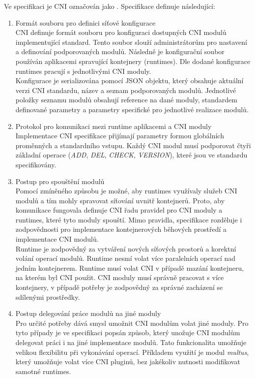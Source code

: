 Ve specifikaci je CNI označován jako \textit{}. \cite{containernetworking_2022_container} Specifikace definuje následující:
\begin{enumerate}
    \item Formát souboru pro definici síťové konfigurace\\
    CNI definuje formát souboru pro konfiguraci dostupných CNI modulů implementující standard. Tento soubor slouží administrátorům pro nastavení a definování podporovaných modulů. Následně je konfigurační soubor používán aplikacemi spravující kontejnery (runtimes). Dle dodané konfigurace runtimes pracují s jednotlivými CNI moduly.\\
    Konfigurace je serializována pomocí JSON objektu, který obsahuje aktuální verzi CNI standardu, název a seznam podporovaných modulů. Jednotlivé položky seznamu modulů obsahují reference na dané moduly, standardem definované parametry a parametry specifické pro jednotlivé realizace modulů.
    \item Protokol pro komunikaci mezi runtime aplikacemi a CNI moduly\\
    Implementace CNI specifikace přijímají parametry formou globálních proměnných a standardního vstupu. Každý CNI modul musí podporovat čtyři základní operace (\textit{ADD}, \textit{DEL}, \textit{CHECK}, \textit{VERSION}), které jsou ve standardu specifikovány.
    \item Postup pro spouštění modulů\\
    Pomocí zmíněného způsobu je možné, aby runtimes využívaly služeb CNI modulů a tím mohly spravovat síťování uvnitř kontejnerů. Proto, aby komunikace fungovala definuje CNI řadu pravidel pro CNI moduly a runtimes, které tyto moduly spouští. Mimo pravidla, specifikace rozděluje i zodpovědnosti pro implementace kontejnerových běhových prostředí a implementace CNI modulů.\\
    Runtime je zodpovědný za vytváření nových síťových prostorů a korektní volání operací modulů. Runtime nesmí volat více paralelních operací nad jedním kontejnerem. Runtime musí volat CNI v případě mazání kontejneru, na kterém byl CNI použit.
    CNI moduly musí správně pracovat s více kontejnery, v případě potřeby je zodpovědný za správné zacházení se sdílenými prostředky.
    \item Postup delegování práce modulů na jiné moduly\label{enumerate:cni}\\
    Pro určité potřeby dává smysl umožnit CNI modulům volat jiné moduly. Pro tyto případy je ve specifikaci popsán způsob, který unožuje CNI modulům delegovat práci i na jiné implementace modulů. Tato funkcionalita umožňuje velikou flexibilitu při vykonávání operací. Příkladem využití je modul \textit{multus}, který umožňuje volat více CNI pluginů, bez jakékoliv nutnosti modifikovat samotné runtimes.\\

\end{enumerate}

